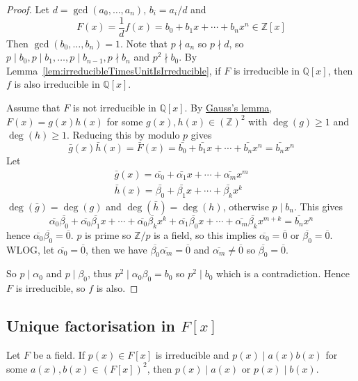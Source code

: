 \begin{proof}
	Let $d = \gcd(a_0, \dots, a_n)$, $b_i = a_i / d$ and
	\[
		F(x) = \frac{1}{d} f(x) = b_0 + b_1 x + \cdots + b_n x^n \in \mathbb{Z}[x]
	\]
	Then $\gcd(b_0, \dots, b_n) = 1$. Note that $p \nmid a_n$ so $p \nmid d$, so $p \mid b_0, p \mid b_1, \dots, p \mid b_{n - 1}, p \nmid b_n$ and $p^2 \nmid b_0$. By Lemma~\ref{lem:irreducibleTimesUnitIsIrreducible}, if $F$ is irreducible in $\mathbb{Q}[x]$, then $f$ is also irreducible in $\mathbb{Q}[x]$.

	Assume that $F$ is not irreducible in $\mathbb{Q}[x]$. By \hyperref[lem:GaussLemma]{Gauss's lemma}, $F(x) = g(x) h(x)$ for some $g(x), h(x) \in {(\mathbb{Z})}^2$ with $\deg(g) \ge 1$ and $\deg(h) \ge 1$. Reducing this by modulo $p$ gives
	\[
		\bar{g}(x) \bar{h}(x) = \bar{F}(x) = \bar{b_0} + \bar{b_1} x + \cdots + \bar{b_n} x^n = \bar{b_n} x^n
	\]
	Let
	\[
		\begin{aligned}
			\bar{g}(x) = \bar{\alpha_0} + \bar{\alpha_1} x + \cdots + \bar{\alpha_m} x^m \\
			\bar{h}(x) = \bar{\beta_0} + \bar{\beta_1} x + \cdots + \bar{\beta_k} x^k
		\end{aligned}
	\]
	$\deg(\bar{g}) = \deg(g)$ and $\deg(\bar{h}) = \deg(h)$, otherwise $p \mid b_n$. This gives
	\[
		\overline{\alpha_0} \overline{\beta_0} + \overline{\alpha_0} \overline{\beta_1} x + \cdots + \overline{\alpha_0} \overline{\beta_k} x^k + \overline{\alpha_1} \overline{\beta_0} x + \cdots + \overline{\alpha_m} \overline{\beta_k} x^{m + k} = \overline{b_n} x^n
	\]
	hence $\overline{\alpha_0} \overline{\beta_0} = \overline{0}$. $p$ is prime so $\mathbb{Z} / p$ is a field, so this implies $\overline{\alpha_0} = \overline{0}$ or $\overline{\beta_0} = \overline{0}$. WLOG, let $\overline{\alpha_0} = \overline{0}$, then we have $\overline{\beta_0} \overline{\alpha_m} = \overline{0}$ and $\overline{\alpha_m} \ne \overline{0}$ so $\overline{\beta_0} = \overline{0}$.

	So $p \mid \alpha_0$ and $p \mid \beta_0$, thus $p^2 \mid \alpha_0 \beta_0 = b_0$ so $p^2 \mid b_0$ which is a contradiction. Hence $F$ is irreducible, so $f$ is also.
\end{proof}

\subsection{Unique factorisation in $F[x]$}

\begin{lemma}\label{lem:pDividesProductImpliesPDividesOneFactor}
	Let $F$ be a field. If $p(x) \in F[x]$ is irreducible and $p(x) \mid a(x) b(x)$ for some $a(x), b(x) \in {(F[x])}^2$, then $p(x) \mid a(x)$ or $p(x) \mid b(x)$.
\end{lemma}

